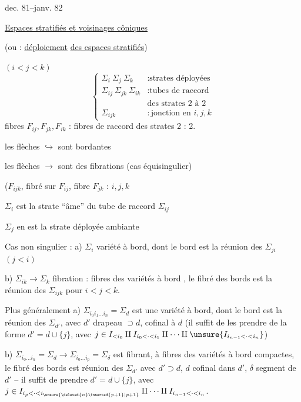 dec. 81--janv. 82

\uline{Espaces stratifiés et voisinages côniques}

(ou : \uline{déploiement} \uline{des espaces stratifiés})


$(i<j<k)$
\[
\left\{\begin{array}{ll}
\Sigma_i\ \Sigma_j\ \Sigma_k &: \text{strates déployées}\\
\Sigma_{ij}\ \Sigma_{jk}\ \Sigma_{ik} &: \text{tubes de raccord}\\
&\text{des strates 2 à 2}\\
\Sigma_{ijk} &: \text{jonction en }i,j,k
\end{array}\right.
\]
fibres $F_{ij},F_{jk},F_{ik}$ : fibres de raccord
 des strates 2 : 2.

les flèches $\hookrightarrow$ sont bordantes

les flèches $\longrightarrow$ sont des fibrations 
(cas équisingulier)

($F_{ijk}$, fibré sur $F_{ij}$, fibre $F_{jk}$ : 
 $i,j,k$

$\Sigma_i$ est la strate  ``âme'' du tube de raccord $\Sigma_{ij}$

$\Sigma_j$ en est la strate déployée ambiante

Cas non singulier : a) $\Sigma_i$ variété à bord, dont le bord est
la réunion des $\Sigma_{ji}$ $(j<i)$

b) $\Sigma_{ik}\longrightarrow\Sigma_k$ fibration : fibres des
variétés à bord , le fibré des bords est
la réunion des $\Sigma_{ijk}$ pour $i<j<k$.

Plus généralement \unsure{;|:} a) $\Sigma_{i_0i_1\ldots i_n}=\Sigma_d$ est une
variété à bord, dont le bord est la réunion des
$\Sigma_{d'}$, avec $d'$ drapeau $\supset d$, cofinal à $d$
(il suffit de les prendre de la forme $d'=d\cup\{j\}$,
avec $j\in I_{<i_0}\amalg I_{i_0<\cdot<i_1}\amalg\cdots\amalg\unsure{I_{i_{n-1}<\cdot<i_n}}$)

b) $\Sigma_{i_0\ldots i_n}=\Sigma_d\longrightarrow\Sigma_{i_0\ldots i_p}=\Sigma_\delta$
est fibrant, à fibres des variétés à bord compactes,
le fibré des bords est réunion des $\Sigma_{d'}$
avec $d'\supset d$, $d$ cofinal dans $d'$, $\delta$ segment 
de $d'$ -- il suffit de prendre $d'=d\cup\{j\}$, avec
$j\in I_{i_p<\cdot<i_{\unsure{\deleted{n}\inserted{p+1}|p+1}}}\amalg\cdots\amalg I_{i_{n-1}<\cdot<i_n}$.

